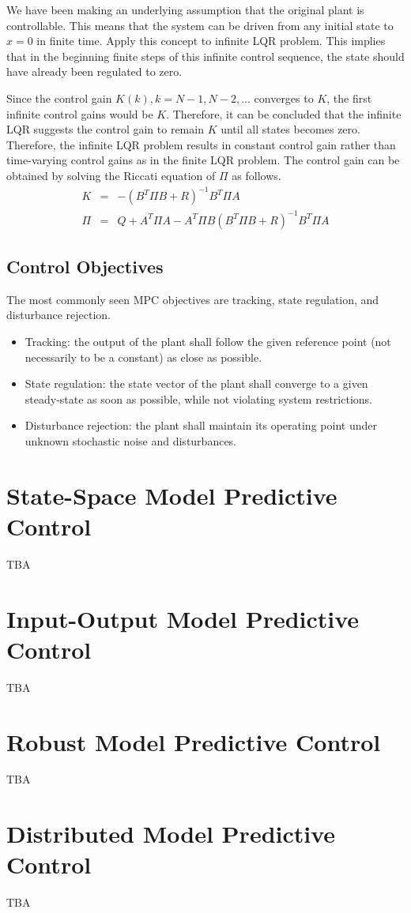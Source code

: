 We have been making an underlying assumption that the original plant is controllable. This means that the system can be driven from any initial state to $x=0$ in finite time. Apply this concept to infinite LQR problem. This implies that in the beginning finite steps of this infinite control sequence, the state should have already been regulated to zero.

Since the control gain $K(k), k=N-1, N-2, ...$ converges to $K$, the first infinite control gains would be $K$. Therefore, it can be concluded that the infinite LQR suggests the control gain to remain $K$ until all states becomes zero. Therefore, the infinite LQR problem results in constant control gain rather than time-varying control gains as in the finite LQR problem. The control gain can be obtained by solving the Riccati equation of $\Pi$ as follows.
\begin{eqnarray}
  K &=& -(B^T\Pi B + R)^{-1}B^T\Pi A \nonumber \\
  \Pi &=& Q + A^T\Pi A-A^T\Pi B(B^T\Pi B+R)^{-1}B^T\Pi A \nonumber
\end{eqnarray}

\subsection{Control Objectives}

The most commonly seen MPC objectives are tracking, state regulation, and disturbance rejection. 
\begin{itemize}
  \item Tracking: the output of the plant shall follow the given reference point (not necessarily to be a constant) as close as possible.
  \item State regulation: the state vector of the plant shall converge to a given steady-state as soon as possible, while not violating system restrictions.
  \item Disturbance rejection: the plant shall maintain its operating point under unknown stochastic noise and disturbances.
\end{itemize}

\section{State-Space Model Predictive Control}

TBA

\section{Input-Output Model Predictive Control}

TBA

\section{Robust Model Predictive Control}

TBA

\section{Distributed Model Predictive Control}

TBA








